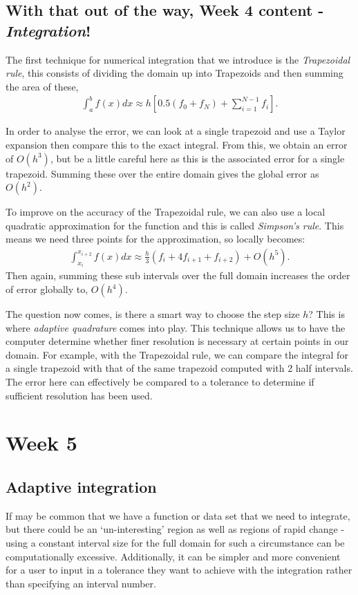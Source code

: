 \documentclass[11pt,a4paper]{report}
\begin{document}
		\subsection{With that out of the way, Week 4 content - \textit{Integration}!}
		The first technique for numerical integration that we introduce is the \textit{Trapezoidal rule}, this consists of dividing the domain up into Trapezoids and then summing the area of these,
		\begin{align}
			\int_{a}^{b} f(x) dx \approx h \left[0.5(f_0 + f_N) + \sum_{i=1}^{N-1} f_i\right].
		\end{align}
		
		In order to analyse the error, we can look at a single trapezoid and use a Taylor expansion then compare this to the exact integral. From this, we obtain an error of $O(h^3)$, but be a little careful here as this is the associated error for a single trapezoid. Summing these over the entire domain gives the global error as $O(h^2)$.
		
		To improve on the accuracy of the Trapezoidal rule, we can also use a local quadratic approximation for the function and this is called \textit{Simpson's rule}. This means we need three points for the approximation, so locally becomes:
		\begin{align}
			\int_{x_i}^{x_{i+2}} f(x) dx \approx \frac{h}{3} (f_i + 4f_{i+1} + f_{i+2}) + O(h^5).
		\end{align}
		Then again, summing these sub intervals over the full domain increases the order of error globally to, $O(h^4)$.
		
		The question now comes, is there a smart way to choose the step size $h$? This is where \textit{adaptive quadrature} comes into play. This technique allows us to have the computer determine whether finer resolution is necessary at certain points in our domain. For example, with the Trapezoidal rule, we can compare the integral for a single trapezoid with that of the same trapezoid computed with 2 half intervals. The error here can effectively be compared to a tolerance to determine if sufficient resolution has been used. 

\newpage
\section{Week 5}
    \subsection{Adaptive integration}
      If may be common that we have a function or data set that we need to integrate, but there could be an `un-interesting' region as well as regions of rapid change - using a constant interval size for the full domain for such a circumstance can be computationally excessive. Additionally, it can be simpler and more convenient for a user to input in a tolerance they want to achieve with the integration rather than specifying an interval number.
\end{document}
